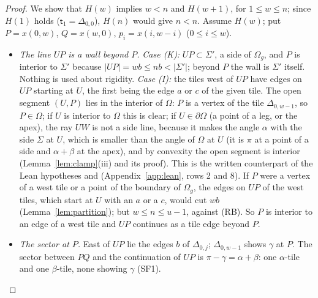 \documentclass[11pt,reqno]{amsart}
\theoremstyle{plain}
\theoremstyle{definition}
\begin{document}
\begin{proof}
We show that $H(w)$ implies $w<n$ and $H(w+1)$, for $1\le w\le n$; since $H(1)$ holds ($\mathsf t_1=\Delta_{0,0}$), $H(n)$ would give $n<n$. Assume $H(w)$; put $P=x(0,w)$, $Q=x(w,0)$, $p_i=x(i,w-i)$ ($0\le i\le w$).
\begin{itemize}
\item[\textbf{Rw1}] \emph{The line $UP$ is a wall beyond $P$.} \emph{Case (K):} $UP\subset\Sigma'$, a side of $\Omega_{g}$, and $P$ is interior to $\Sigma'$ because $|UP|=wb\le nb<|\Sigma'|$; beyond $P$ the wall is $\Sigma'$ itself. Nothing is used about rigidity. \emph{Case (I):} the tiles west of $UP$ have edges on $UP$ starting at $U$, the first being the edge $a$ or $c$ of the given tile. The open segment $(U,P)$ lies in the interior of $\Omega$: $P$ is a vertex of the tile $\Delta_{0,w-1}$, so $P\in\Omega$; if $U$ is interior to $\Omega$ this is clear; if $U\in\partial\Omega$ (a point of a leg, or the apex), the ray $UW$ is not a side line, because it makes the angle $\alpha$ with the side $\Sigma$ at $U$, which is smaller than the angle of $\Omega$ at $U$ (it is $\pi$ at a point of a side and $\alpha+\beta$ at the apex), and by convexity the open segment is interior (Lemma~\ref{lem:clamp}(iii) and its proof). This is the written counterpart of the Lean hypotheses  and  (Appendix~\ref{app:lean}, rows 2 and 8). If $P$ were a vertex of a west tile or a point of the boundary of $\Omega_{g}$, the edges on $UP$ of the west tiles, which start at $U$ with an $a$ or a $c$, would cut $wb$ (Lemma~\ref{lem:partition}); but $w\le n\le u-1$, against (RB). So $P$ is interior to an edge of a west tile and $UP$ continues as a tile edge beyond $P$.
\item[\textbf{Rw2}] \emph{The sector at $P$.} East of $UP$ lie the edges $b$ of $\Delta_{0,j}$; $\Delta_{0,w-1}$ shows $\gamma$ at $P$. The sector between $PQ$ and the continuation of $UP$ is $\pi-\gamma=\alpha+\beta$: one $\alpha$-tile and one $\beta$-tile, none showing $\gamma$ (SF1).

\end{itemize}
\end{proof}
\end{document}
